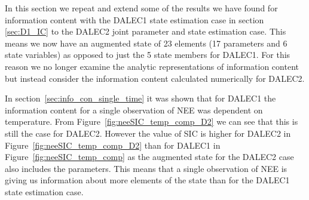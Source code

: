 \documentclass[11pt]{article}
\begin{document}
In this section we repeat and extend some of the results we have found for information content with the DALEC1 state estimation case in section \ref{sec:D1_IC} to the DALEC2 joint parameter and state estimation case. This means we now have an augmented state of 23 elements (17 parameters and 6 state variables) as opposed to just the 5 state members for DALEC1. For this reason we no longer examine the analytic representations of information content but instead consider the information content calculated numerically for DALEC2. 

In section~\ref{sec:info_con_single_time} it was shown that for DALEC1 the information content for a single observation of NEE was dependent on temperature. From Figure~\ref{fig:neeSIC_temp_comp_D2} we can see that this is still the case for DALEC2. However the value of SIC is higher for DALEC2 in Figure~\ref{fig:neeSIC_temp_comp_D2} than for DALEC1 in Figure~\ref{fig:neeSIC_temp_comp} as the augmented state for the DALEC2 case also includes the parameters. This means that a single observation of NEE is giving us information about more elements of the state than for the DALEC1 state estimation case.
\end{document}
